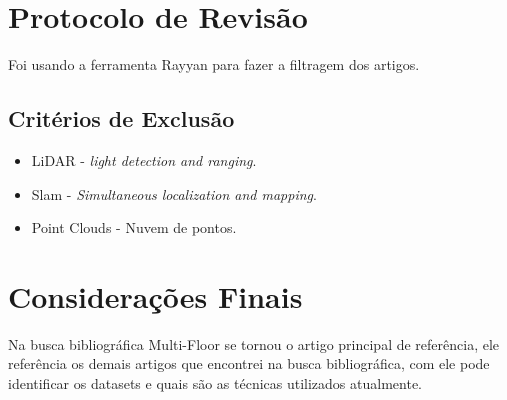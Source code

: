 



\section{Protocolo de Revisão}\label{cp:revisao:protocolo}

Foi usando a ferramenta Rayyan\cite{Rayyn} para fazer a filtragem dos artigos.


\subsection{Critérios de Exclusão}
\begin{itemize}
    \item LiDAR - \textit{light detection and ranging}.
    \item Slam  - \textit{Simultaneous localization and mapping}.
    \item Point Clouds - Nuvem de pontos.    
\end{itemize}



\section{Considerações Finais}

Na busca bibliográfica Multi-Floor  \cite{kratochvila2024multi} se tornou o artigo principal de referência, ele referência os demais artigos que encontrei na busca bibliográfica, com ele pode identificar os datasets e quais são as técnicas utilizados atualmente.